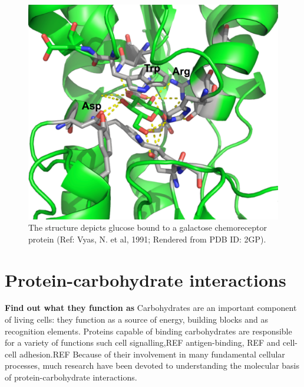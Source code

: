 \begin{figure}
 \centering
 \includegraphics[width=6in]{figures/introduction/sugar_protein_binding.pdf}
 \caption[An example of sugar-lectin binding]{The structure depicts glucose bound to a galactose chemoreceptor protein (Ref: Vyas, N. et al, 1991; Rendered from PDB ID: 2GP).}
 \label{fig:sugar_protein}
\end{figure}

\section{Protein-carbohydrate interactions}
\textbf{Find out what they function as} Carbohydrates are an important component of living cells: they function as a source of energy, building blocks and as recognition elements. Proteins capable of binding carbohydrates are responsible for a variety of functions such cell signalling,REF  antigen-binding, REF and cell-cell adhesion.REF Because of their involvement in many fundamental cellular processes, much research have been devoted to understanding the molecular basis of protein-carbohydrate interactions. 

